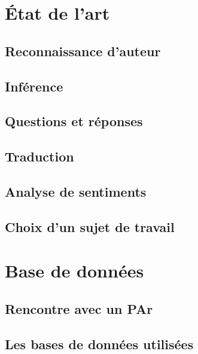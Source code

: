 \documentclass[11pt,a4paper]{article}
\begin{document}
%
%

\cleardoublepage
%
%

\setcounter{page}{1}


\newcommand{\sectionbreak}{\clearpage}

%
%

%
%

\section{\'Etat de l'art}
\subsection{Reconnaissance d'auteur}
\subsection{Inférence}
\subsection{Questions et réponses}
\subsection{Traduction}
\subsection{Analyse de sentiments}
\subsection{Choix d'un sujet de travail}

\section{Base de données}
\subsection{Rencontre avec un PAr}
\subsection{Les bases de données utilisées}
\end{document}
